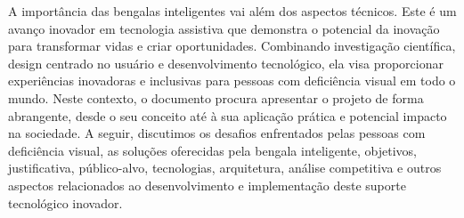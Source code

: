 A importância das bengalas inteligentes vai além dos aspectos técnicos. Este é um avanço inovador em tecnologia assistiva que demonstra o potencial da inovação para transformar vidas e criar oportunidades. Combinando investigação científica, design centrado no usuário e desenvolvimento tecnológico, ela visa proporcionar experiências inovadoras e inclusivas para pessoas com deficiência visual em todo o mundo. Neste contexto, o documento procura apresentar o projeto de forma abrangente, desde o seu conceito até à sua aplicação prática e potencial impacto na sociedade. A seguir, discutimos os desafios enfrentados pelas pessoas com deficiência visual, as soluções oferecidas pela bengala inteligente, objetivos, justificativa, público-alvo, tecnologias, arquitetura, análise competitiva e outros aspectos relacionados ao desenvolvimento e implementação deste suporte tecnológico inovador.





